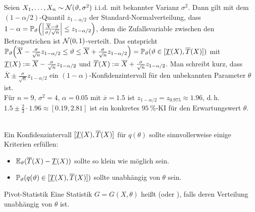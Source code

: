 \begin{Bsp}
    Seien $X_1, \dotsc, X_n \sim \mathcal{N}(\vartheta, \sigma^2)$ i.i.d. mit bekannter Varianz $\sigma^2$.
    Dann gilt mit dem $(1 - \alpha/2)$-Quantil $z_{1-\alpha/2}$
    der Standard-Normalverteilung, dass
    $1 - \alpha =
    \mathbb{P}_\vartheta\!\left(\left|\frac{\overline{X} - \vartheta}{\sigma/\sqrt{n}}\right| \le
    z_{1-\alpha/2}\right)$,
    denn die Zufallsvariable zwischen den Betragsstrichen ist $\mathcal{N}(0, 1)$-verteilt.
    Das entspricht\\
    $\mathbb{P}_\vartheta\!\left(\overline{X} - \frac{\sigma}{\sqrt{n}} z_{1-\alpha/2} \le \vartheta \le
    \overline{X} + \frac{\sigma}{\sqrt{n}} z_{1-\alpha/2}\right)
    = \mathbb{P}_\vartheta(\vartheta \in [\underline{T}(X), \overline{T}(X)])$ mit
    $\underline{T}(X) := \overline{X} - \frac{\sigma}{\sqrt{n}} z_{1-\alpha/2}$ und
    $\overline{T}(X) := \overline{X} + \frac{\sigma}{\sqrt{n}} z_{1-\alpha/2}$.
    Man schreibt kurz, dass $\overline{X} \pm \frac{\sigma}{\sqrt{n}} z_{1-\alpha/2}$ ein
    $(1 - \alpha)$-Konfidenzintervall für den unbekannten Parameter $\theta$ ist.\\
    Für $n = 9$, $\sigma^2 = 4$, $\alpha = \num{0.05}$ mit $\overline{x} = \num{1.5}$ ist
    $z_{1-\alpha/2} = z_{0.975} \approx \num{1.96}$, d.\,h.\\
    $\num{1.5} \pm \frac{2}{3} \cdot \num{1.96} \approx [\num{0.19}, \num{2.81}]$ ist ein
    konkretes $\SI{95}{\percent}$-KI für den Erwartungswert $\theta$.
\end{Bsp}

\linie

\begin{Bem}\\
    Ein Konfidenzintervall $[\underline{T}(X), \overline{T}(X)]$ für $q(\theta)$ sollte sinnvollerweise
    einige Kriterien erfüllen:
    \begin{itemize}
        \item
        $\mathbb{E}_\vartheta(\overline{T}(X) - \underline{T}(X))$ sollte so klein wie möglich sein.
        
        \item
        $\mathbb{P}_\vartheta(q(\vartheta) \in [\underline{T}(X), \overline{T}(X)])$ sollte unabhängig von $\theta$ sein.
    \end{itemize}
\end{Bem}

\begin{Def}{Pivot-Statistik}
    Eine Statistik $G = G(X, \theta)$ heißt  (oder ),
    falls deren Verteilung unabhängig von $\theta$ ist.
\end{Def}

